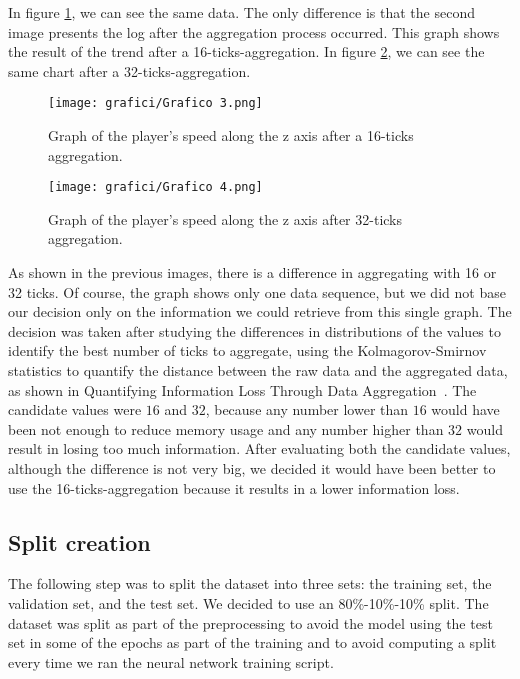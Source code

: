 		In figure \ref{fig:gr1}, we can see the same data. 
		The only difference is that the second image presents the log after the aggregation process occurred.
		This graph shows the result of the trend after a 16-ticks-aggregation. 
		In figure \ref{fig:gr2}, we can see the same chart after a 32-ticks-aggregation. 
		
		\begin{figure}[!h] 
			\centering 
			\texttt{[image: grafici/Grafico 3.png]}
			\caption{\label{fig:gr1}Graph of the player's speed along the z axis after a 16-ticks aggregation.}
		\end{figure}
		
		\begin{figure}[!h] 
			\centering 
			\texttt{[image: grafici/Grafico 4.png]}
			\caption{\label{fig:gr2}Graph of the player's speed along the z axis after 32-ticks aggregation.}
		\end{figure}
		
		As shown in the previous images, there is a difference in aggregating with 16 or 32 ticks. 
		Of course, the graph shows only one data sequence, but we did not base our decision only on the information we could retrieve from this single graph. 
		The decision was taken after studying the differences in distributions of the values to identify the best number of ticks to aggregate, 
		using the Kolmagorov-Smirnov statistics to quantify the distance between the raw data and the aggregated data, as shown in Quantifying Information Loss Through Data Aggregation~\cite{womak:info_loss}.
		The candidate values were $16$ and $32$, because any number lower than $16$ would have been not enough to reduce memory usage and any number higher than $32$ would result in losing too much information. 
		After evaluating both the candidate values, although the difference is not very big, we decided it would have been better to use the 16-ticks-aggregation because it results in a lower information loss. 
		
		
	\subsection{Split creation}
	
		The following step was to split the dataset into three sets: the training set, the validation set, and the test set. 
		We decided to use an 80\%-10\%-10\% split. 
		The dataset was split as part of the preprocessing to avoid the model using the test set in some of the epochs as part of the training and to avoid computing a split every time we ran the neural network training script.
		
